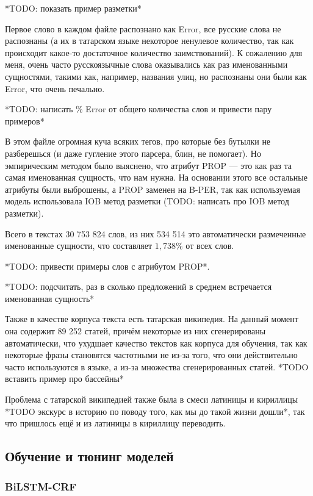 *TODO: показать пример разметки*

Первое слово в каждом файле распознано как Error, все русские слова не распознаны (а их в татарском языке некоторое ненулевое количество, так как происходит какое-то достаточное количество заимствований). К сожалению для меня, очень часто русскоязычные слова оказывались как раз именованными сущностями, такими как, например, названия улиц, но распознаны они были как Error, что очень печально.

*TODO: написать \% Error от общего количества слов и привести пару примеров*

В этом файле огромная куча всяких тегов, про которые без бутылки не разберешься (и даже гугление этого парсера, блин, не помогает). Но эмпирическим методом было выяснено, что атрибут PROP --- это как раз та самая именованная сущность, что нам нужна. На основании этого все остальные атрибуты были выброшены, а PROP заменен на B-PER, так как используемая модель использовала IOB метод разметки (TODO: написать про IOB метод разметки).

Всего в текстах 30 753 824 слов, из них 534 514 это автоматически размеченные именованные сущности, что составляет $1,738\%$ от всех слов. 

*TODO: привести примеры слов с атрибутом PROP*.

*TODO: подсчитать, раз в сколько предложений в среднем встречается именованная сущность*

Также в качестве корпуса текста есть татарская википедия. На данный момент она содержит 89 252 статей, причём некоторые из них сгенерированы автоматически, что ухудшает качество текстов как корпуса для обучения, так как некоторые фразы становятся частотными не из-за того, что они действительно часто используются в языке, а из-за множества сгенерированных статей. *TODO вставить пример про бассейны*

Проблема с татарской википедией также была в смеси латиницы и кириллицы *TODO экскурс в историю по поводу того, как мы до такой жизни дошли*, так что пришлось ещё и из латиницы в кириллицу переводить.


\subsection{Обучение и тюнинг моделей}

\subsubsection{BiLSTM-CRF}

